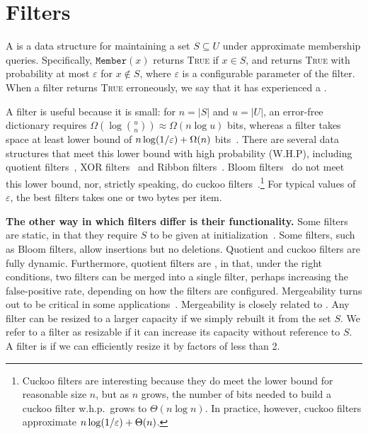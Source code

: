 
\section{Filters}

A  is a data structure for maintaining a set $S\subseteq U$ under approximate membership queries. Specifically, $\texttt{Member}(x)$ returns \textsc{True} if $x\in S$, and returns \textsc{True} with probability at most $\varepsilon$ for $x\notin S$, where $\varepsilon$ is a configurable parameter of the filter.  When a filter returns \textsc{True} erroneously, we say that it has experienced a .

A filter is useful because it is small: for $n= |S|$ and $u = |U|$, an error-free dictionary requires $\Omega(\log {u\choose n}) \approx \Omega(n \log u)$ bits, whereas a filter  takes space at least  lower bound of $n\log (1/\varepsilon) + \Omega(n)$ bits~\cite{CarterFG78}.  There are several data structures that meet this lower bound with high probability (W.H.P), including quotient filters~\cite{Cleary84,PaghPaRa05,DillingerM09,BenderFaJo12a,PandeyBJP17,PandeyCDBFJ21}, XOR filters~\cite{GrafLe20} and Ribbon filters~\cite{DillingerW21}.  Bloom filters~\cite{Bloom70} do not meet this lower bound, nor, strictly speaking, do cuckoo filters~\cite{FanAnKa14,BreslowJ18}.\footnote{Cuckoo filters are interesting because they do meet the lower bound for reasonable size $n$, but as $n$ grows, the number of bits needed to build a cuckoo filter w.h.p.\ grows to $\Theta(n\log n)$.  In practice, however, cuckoo filters approximate $n\log (1/\varepsilon) + \Theta(n)$.}
%
For typical values of $\varepsilon$, the best filters takes one or two bytes per item.

\noindent
{\bf The other way in which filters differ is their functionality.} Some filters are static, in that they require $S$ to be given at initialization~\cite{GrafL19,DillingerW21}.  Some filters, such as Bloom filters, allow insertions but no deletions.  Quotient and cuckoo filters are fully dynamic.  Furthermore, quotient filters are , in that, under the right conditions, two filters can be merged into a single filter, perhaps increasing the false-positive rate, depending on how the filters are configured.  Mergeability turns out to be critical in some applications~\cite{conway2020splinterdb,PandeyABFJP18Cell}. Mergeability is closely related to .  Any filter can be resized to a larger capacity if we  simply rebuilt it from the set $S$.  We refer to a filter as resizable if it can increase its capacity without reference to $S$.  A filter is  if we can efficiently resize it by factors of less than 2.    

